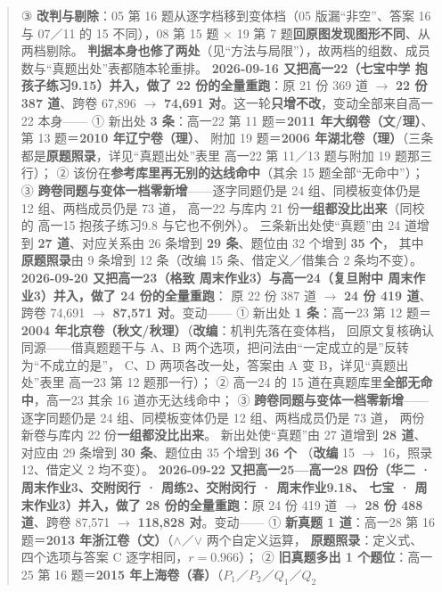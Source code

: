 \documentclass[a4paper,11pt]{article}
\begin{document}
\begin{quote}
③ \textbf{改判与剔除}：05 第 16 题从逐字档移到变体档（05 版漏``非空''、答案 16 与 07／11 的 15
不同），08 第 15 题 $\times$ 19 第 7 题\textbf{回原图发现图形不同}、从两档剔除。
\textbf{判据本身也修了两处}（见``方法与局限''），故两档的组数、成员数与``真题出处''表都随本轮重排。
\textbf{2026-09-16 又把高一22（七宝中学 抱孩子练习9.15）并入，做了 22 份的全量重跑}：原 21 份 369 道 $\to$
\textbf{22 份 387 道}、跨卷 67,896 $\to$ \textbf{74,691 对}。这一轮\textbf{只增不改}，变动全部来自高一22 本身------
① 新出处 \textbf{3 条}：高一22 第 11 题＝\textbf{2011 年大纲卷（文/理）}、第 13 题＝\textbf{2010 年辽宁卷（理）}、
附加 19 题＝\textbf{2006 年湖北卷（理）}（三条都是\textbf{原题照录}，详见``真题出处''表里 高一22 第 11／13 题与附加 19 题那三行）；
② 该份在\textbf{参考库里再无别的达线命中}（其余 15 题全部``无命中''）；
③ \textbf{跨卷同题与变体一档零新增}------逐字同题仍是 24 组、同模板变体仍是 12 组、两档成员仍是 73 道，
高一22 与库内 21 份\textbf{一组都没比出来}（同校的 高一15 抱孩子练习9.8 与它也不例外）。
三条新出处使``真题''由 24 道增到 \textbf{27 道}、对应关系由 26 条增到 \textbf{29 条}、题位由 32 个增到 \textbf{35 个}，
其中\textbf{原题照录}由 9 条增到 12 条（改编 15 条、借定义／借集合 2 条均不变）。
\textbf{2026-09-20 又把高一23（格致 周末作业3）与高一24（复旦附中 周末作业3）并入，做了 24 份的全量重跑}：
原 22 份 387 道 $\to$ \textbf{24 份 419 道}、跨卷 74,691 $\to$ \textbf{87,571 对}。变动------
① 新出处 \textbf{1 条}：高一23 第 12 题＝\textbf{2004 年北京卷（秋文/秋理）}（\textbf{改编}：机判先落在变体档，
回原文复核确认同源------借真题题干与 A、B 两个选项，把问法由``一定成立的是''反转为``不成立的是''，
C、D 两项各改一处，答案由 A 变 B，详见``真题出处''表里 高一23 第 12 题那一行）；
② 高一24 的 15 道在真题库里\textbf{全部无命中}，高一23 其余 16 道亦无达线命中；
③ \textbf{跨卷同题与变体一档零新增}------逐字同题仍是 24 组、同模板变体仍是 12 组、两档成员仍是 73 道，
两份新卷与库内 22 份\textbf{一组都没比出来}。
新出处使``真题''由 27 道增到 \textbf{28 道}、对应由 29 条增到 \textbf{30 条}、题位由 35 个增到 \textbf{36 个}
（\textbf{改编} 15 $\to$ 16，照录 12、借定义 2 均不变）。
\textbf{2026-09-22 又把高一25---高一28 四份（华二 · 周末作业3、交附闵行 · 周练2、交附闵行 · 周末作业9.18、
七宝 · 周末作业3）并入，做了 28 份的全量重跑}：原 24 份 419 道 $\to$ \textbf{28 份 488 道}、跨卷
87,571 $\to$ \textbf{118,828 对}。变动------
① \textbf{新真题 1 道}：高一28 第 16 题＝\textbf{2013 年浙江卷（文）}（\(\wedge\)／\(\vee\) 两个自定义运算，
\textbf{原题照录}：定义式、四个选项与答案 C 逐字相同，\(r=0.966\)）；
② \textbf{旧真题多出 1 个题位}：高一25 第 16 题＝\textbf{2015 年上海卷（春）}（\(P_1\)／\(P_2\)／\(Q_1\)／\(Q_2\)

\end{quote}
\end{document}
